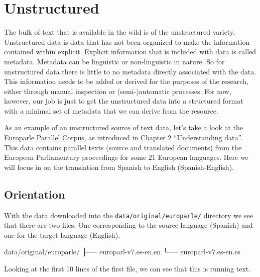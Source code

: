 \documentclass[
  letterpaper,
]{latex/krantz}
\newenvironment{Shaded}{\begin{snugshade}}{\end{snugshade}}
\newcommand{\ExtensionTok}[1]{\textcolor[rgb]{0.00,0.23,0.31}{#1}}
\newcommand{\NormalTok}[1]{\textcolor[rgb]{0.00,0.23,0.31}{#1}}
\begin{document}
\hypertarget{unstructured}{%
\section{Unstructured}\label{unstructured}}

The bulk of text that is available in the wild is of the unstructured
variety. Unstructured data is data that has not been organized to make
the information contained within explicit. Explicit information that is
included with data is called metadata. Metadata can be linguistic or
non-linguistic in nature. So for unstructured data there is little to no
metadata directly associated with the data. This information needs to be
added or derived for the purposes of the research, either through manual
inspection or (semi-)automatic processes. For now, however, our job is
just to get the unstructured data into a structured format with a
minimal set of metadata that we can derive from the resource.

As an example of an unstructured source of text data, let's take a look
at the \href{https://www.statmt.org/europarl/}{Europarle Parallel
Corpus}, as introduced in
\protect\hyperlink{sec-understanding-data}{Chapter 2 ``Understanding
data''}. This data contains parallel texts (source and translated
documents) from the European Parliamentary proceedings for some 21
European languages. Here we will focus in on the translation from
Spanish to English (Spanish-English).

\hypertarget{orientation}{%
\subsection{Orientation}\label{orientation}}

With the data downloaded into the \texttt{data/original/europarle/}
directory we see that there are two files. One corresponding to the
source language (Spanish) and one for the target language (English).

\begin{Shaded}
\begin{Highlighting}[]
\ExtensionTok{data/original/europarle/}
\ExtensionTok{├──}\NormalTok{ europarl{-}v7.es{-}en.en}
\ExtensionTok{└──}\NormalTok{ europarl{-}v7.es{-}en.es}
\end{Highlighting}
\end{Shaded}

Looking at the first 10 lines of the first file, we can see that this is
running text.
\end{document}

